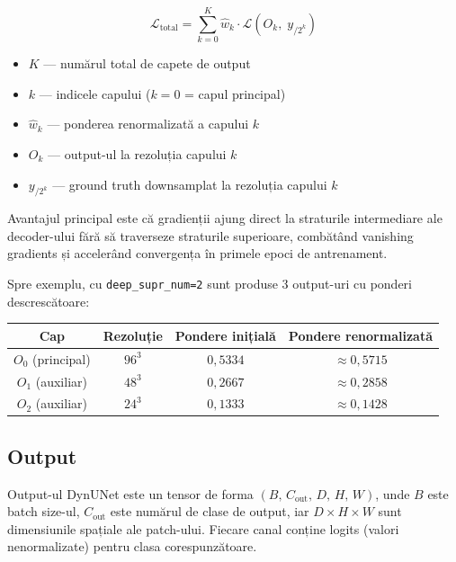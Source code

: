 \documentclass[12pt, a4paper]{report}
\begin{document}
\begin{equation}
    \mathcal{L}_{\text{total}}
    = \sum_{k=0}^{K} \hat{w}_k \cdot
      \mathcal{L}\!\left(O_k,\; y_{/2^k}\right)
\end{equation}

\begin{itemize}
    \item $K$ — numărul total de capete de output
    \item $k$ — indicele capului ($k=0$ = capul principal)
    \item $\hat{w}_k$ — ponderea renormalizată a capului $k$
    \item $O_k$ — output-ul la rezoluția capului $k$
    \item $y_{/2^k}$ — ground truth downsamplat la rezoluția capului $k$
\end{itemize}


Avantajul principal este că gradienții ajung direct la straturile
intermediare ale decoder-ului fără să traverseze straturile
superioare, combătând vanishing gradients și accelerând convergența
în primele epoci de antrenament.

Spre exemplu, cu \texttt{deep\_supr\_num=2} sunt produse
3 output-uri cu ponderi descrescătoare:

\begin{center}
\begin{tabular}{cccc}
    \toprule
    \textbf{Cap} & \textbf{Rezoluție} &
    \textbf{Pondere inițială} & \textbf{Pondere renormalizată} \\
    \midrule
    $O_0$ (principal) & $96^3$ & $0{,}5334$ & $\approx 0{,}5715$ \\
    $O_1$ (auxiliar)  & $48^3$ & $0{,}2667$ & $\approx 0{,}2858$ \\
    $O_2$ (auxiliar)  & $24^3$ & $0{,}1333$ & $\approx 0{,}1428$ \\
    \bottomrule
\end{tabular}
\end{center}

\subsection{Output}

Output-ul DynUNet este un tensor de forma
$(B,\, C_{\text{out}},\, D,\, H,\, W)$, unde $B$ este batch
size-ul, $C_{\text{out}}$ este numărul de clase de output,
iar $D \times H \times W$ sunt dimensiunile spațiale ale
patch-ului. Fiecare canal conține logits (valori nenormalizate)
pentru clasa corespunzătoare.
\end{document}
